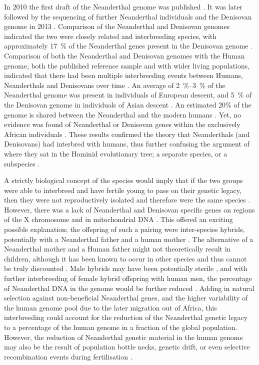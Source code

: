 In 2010 the first draft of the Neanderthal genome was published \parencite{Green_2010}. It was later followed by the sequencing of further Neanderthal individuals and the Denisovan genome in 2013 \parencites{Wang_2013}{Meyer_2012}{Martinón-Torres_2011}. Comparison of the Neanderthal and Denisovan genomes indicated the two were closely related and interbreeding species, with approximately \SI{17}{\percent} of the Neanderthal genes present in the Denisovan genome \parencite{Reich_2010}. Comparison of both the Neanderthal and Denisovan genomes with the Human genome, both the published reference sample and with wider living populations, indicated that there had been multiple interbreeding events between Humans, Neanderthals and Denisovans over time \parencites{Sankararaman_2014}{Sankararaman_2012}. An average of \SIrange[range-phrase=--]{2}{3}{\percent} of the Neanderthal genome was present in individuals of European descent, and \SI{5}{\percent} of the Denisovan genome in individuals of Asian descent \parencites{Sankararaman_2014}{Reich_2010}. An estimated 20\% of the genome is shared between the Neanderthal and the modern humans \parencite{Yong_2014}. Yet, no evidence was found of Neanderthal or Denisovan genes within the exclusively African individuals \parencite{Sankararaman_2012}. These results confirmed the theory that Neanderthals (and Denisovans) had interbred with humans, thus further confusing the argument of where they sat in the Hominid evolutionary tree; a separate species, or a subspecies \parencite{Mason_2011}.

A strictly biological concept of the species would imply that if the two groups were able to interbreed and have fertile young to pass on their genetic legacy, then they were not reproductively isolated and therefore were the same species \parencite{White_2014}. 
However,  there was a lack of Neanderthal and Denisovan specific genes on regions of the X chromosome and in mitochondrial DNA \parencite{Serre_2004}. This offered an exciting possible explanation; the offspring of such a pairing were inter-species hybrids, potentially with a Neanderthal father and a human mother \parencites{Serre_2004}{Mason_2011}. The alternative of a Neanderthal mother and a Human father might not theoretically result in children, although it has been known to occur in other species and thus cannot be truly discounted \parencite{Patterson_2006}. Male hybrids may have been potentially sterile \parencite{Patterson_2006}, and with further interbreeding of female hybrid offspring with human men, the percentage of Neanderthal DNA in the genome would be further reduced \parencite{Mason_2011}. Adding in natural selection against non-beneficial Neanderthal genes, and the higher variability of the human genome pool due to the later migration out of Africa, this interbreeding could account for the reduction of the Neanderthal genetic legacy to a percentage of the human genome in a fraction of the global population. However, the reduction of Neanderthal genetic material in the human genome may also be the result of population bottle necks, genetic drift, or even selective recombination events during fertilisation \parencites{Harvati_2007}{Awadalla_1990}. 
	

